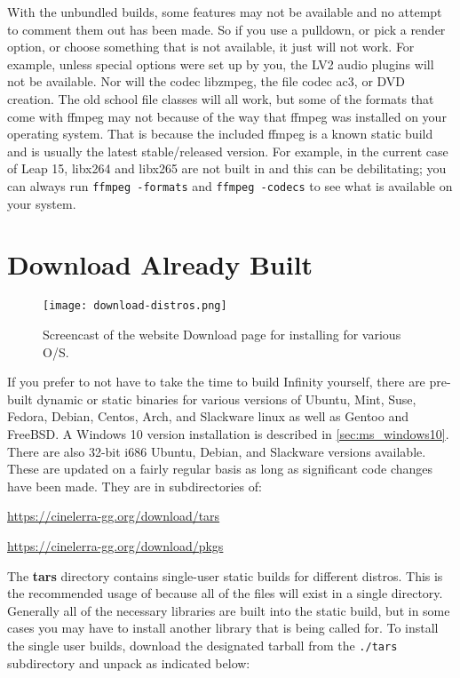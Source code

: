 With the unbundled builds, some features may not be available and no attempt to comment them out has been made.  
So if you use a pulldown, or pick a render option, or choose something that is not available, it just will not work.  
For example, unless special options were set up by you, the LV2 audio plugins will not be available.  
Nor will the codec libzmpeg, the file codec ac3, or DVD creation.  
The old school file classes will all work, but some of the formats that come with ffmpeg may not because of the way that ffmpeg was installed on your operating system.  
That is because the \CGG{} included ffmpeg is a known static build and is usually the latest stable/released version.  
For example, in the current case of Leap 15, libx264 and libx265 are not built in and this can be debilitating; you can always run \texttt{ffmpeg -formats} and \texttt{ffmpeg -codecs} to see what is available on your system.


\section{Download Already Built \CGG{}}%
\label{sec:download_already_built_cinelerra_gg}

\begin{figure}[htpb]
    \centering
    \texttt{[image: download-distros.png]}
    \caption{Screencast of the website Download page for installing \CGG{} for various O/S.}
    \label{fig:download-distros}
\end{figure}

If you prefer to not have to take the time to build \CGG{} Infinity yourself, there are pre-built dynamic or static binaries for various versions of Ubuntu, Mint, Suse, Fedora, Debian, Centos, Arch, and Slackware linux as well as Gentoo and FreeBSD.  
A Windows 10 version installation is described in \ref{sec:ms_windows10}.
There are also 32-bit i686 Ubuntu, Debian, and Slackware versions available.  
These are updated on a fairly regular basis as long as significant code changes have been made.  
They are in subdirectories of:

{\small \url{https://cinelerra-gg.org/download/tars}
	
	\url{https://cinelerra-gg.org/download/pkgs}}

The \textbf{tars} directory contains single-user static builds for different distros.  
This is the recommended usage of \CGG{} because all of the files will exist in a single directory.
Generally all of the necessary libraries are built into the static build, but in some cases you may
have to install another library that is being called for.  
To install the single user builds, download the designated tarball from the \texttt{./tars} subdirectory and unpack as indicated below:

